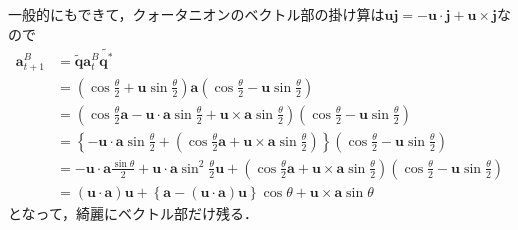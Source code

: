 一般的にもできて，クォータニオンのベクトル部の掛け算は$\boldsymbol{u} \boldsymbol{j} = - \boldsymbol{u} \cdot \boldsymbol{j} + \boldsymbol{u} \times \boldsymbol{j}$なので
{\tiny
  \begin{align}
    \boldsymbol{a}^{B}_{t+1} &= \tilde{\boldsymbol{q}} \boldsymbol{a}^{B}_{t} \tilde{\boldsymbol{q}^{\ast}}\\
    &= \left(\cos \frac{\theta}{2} + \boldsymbol{u} \sin \frac{\theta}{2}\right) \boldsymbol{a} \left(\cos \frac{\theta}{2} - \boldsymbol{u} \sin \frac{\theta}{2}\right)\\
    &= \left(\cos \frac{\theta}{2} \boldsymbol{a} - \boldsymbol{u} \cdot \boldsymbol{a} \sin \frac{\theta}{2} + \boldsymbol{u} \times \boldsymbol{a} \sin \frac{\theta}{2}\right) \left(\cos \frac{\theta}{2} - \boldsymbol{u} \sin \frac{\theta}{2}\right)\\
    &= \left\{- \boldsymbol{u} \cdot \boldsymbol{a} \sin \frac{\theta}{2} + \left( \cos \frac{\theta}{2} \boldsymbol{a}  + \boldsymbol{u} \times \boldsymbol{a} \sin \frac{\theta}{2}\right)\right\} \left(\cos \frac{\theta}{2} - \boldsymbol{u} \sin \frac{\theta}{2}\right)\\
    &= - \boldsymbol{u} \cdot \boldsymbol{a} \frac{\sin \theta}{2}
    + \boldsymbol{u} \cdot \boldsymbol{a} \sin^2 \frac{\theta}{2} \boldsymbol{u}
    + \left( \cos \frac{\theta}{2} \boldsymbol{a}  + \boldsymbol{u} \times \boldsymbol{a} \sin \frac{\theta}{2}\right) \left(\cos \frac{\theta}{2} - \boldsymbol{u} \sin \frac{\theta}{2}\right)\\
    &= \left(\boldsymbol{u} \cdot \boldsymbol{a}\right)\boldsymbol{u} + \left\{\boldsymbol{a} - \left(\boldsymbol{u} \cdot \boldsymbol{a}\right)\boldsymbol{u}\right\} \cos \theta + \boldsymbol{u} \times \boldsymbol{a} \sin \theta
  \end{align}
}
となって，綺麗にベクトル部だけ残る．

